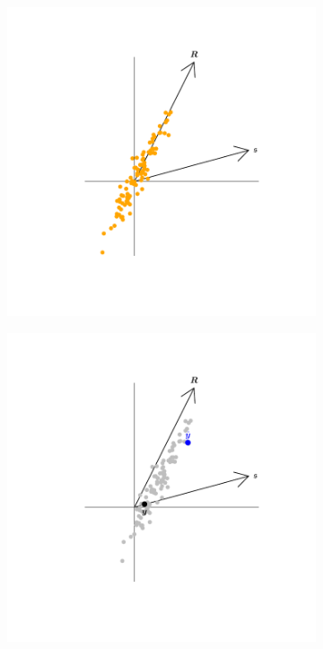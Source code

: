 \documentclass[12pt]{article}
\theoremstyle{definition}
\theoremstyle{property}
\begin{document}
\begin{figure}[!h]
    \centering
    \begin{subfigure}[!h]{0.48\textwidth}
        \includegraphics[width=\textwidth]{Figs/InsampDir_1_George.pdf}
        \caption{}
    \end{subfigure}
    \begin{subfigure}[!h]{0.48\textwidth}
        \includegraphics[width=\textwidth]{Figs/InsampDir_2_George.pdf}

\end{subfigure}
\end{figure}
\end{document}

